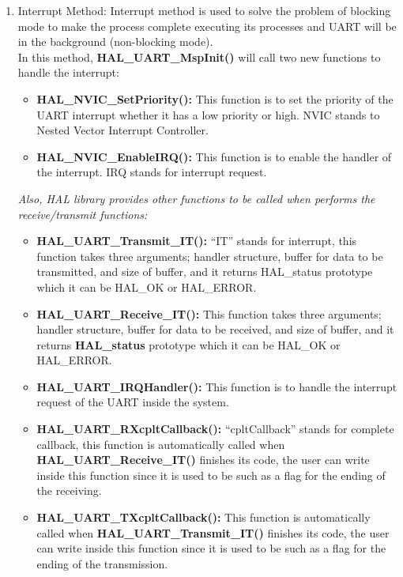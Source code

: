 \begin{enumerate}
\begin{enumerate}
        \clearpage
        \item Interrupt Method:
        Interrupt method is used to solve the problem of blocking mode to make the process complete executing its processes and UART will be in the background (non-blocking mode).\\
        In this method, \textbf{HAL\_UART\_MspInit()} will call two new functions to handle the interrupt:
        
        \begin{itemize}
            \item \textbf{HAL\_NVIC\_SetPriority():} This function is to set the priority of the UART interrupt whether it has a low priority or high. NVIC stands to Nested Vector Interrupt Controller.
            \item \textbf{HAL\_NVIC\_EnableIRQ():} This function is to enable the handler of the interrupt. IRQ stands for interrupt request.
        \end{itemize}
        
        \emph{Also, HAL library provides other functions to be called when performs the receive/transmit functions:}
        \begin{itemize}
            \item \textbf{HAL\_UART\_Transmit\_IT():} “IT” stands for interrupt, this function takes three arguments; handler structure, buffer for data to be transmitted, and size of buffer, and it returns HAL\_status prototype which it can be HAL\_OK or HAL\_ERROR. 
            \item \textbf{HAL\_UART\_Receive\_IT():} This function takes three arguments; handler structure, buffer for data to be received, and size of buffer, and it returns \textbf{HAL\_status} prototype which it can be HAL\_OK or HAL\_ERROR.
            \item \textbf{HAL\_UART\_IRQHandler():} This function is to handle the interrupt request of the UART inside the system.
            \item \textbf{HAL\_UART\_RXcpltCallback():} “cpltCallback” stands for complete callback, this function is automatically called when \textbf{HAL\_UART\_Receive\_IT()} finishes its code, the user can write inside this function since it is used to be such as a flag for the ending of the receiving. 
            \item \textbf{HAL\_UART\_TXcpltCallback():} This function is automatically called when \textbf{HAL\_UART\_Transmit\_IT()} finishes its code, the user can write inside this function since it is used to be such as a flag for the ending of the transmission.


\end{itemize}
\end{enumerate}
\end{enumerate}
